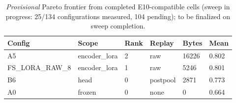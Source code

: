 \begin{table}[t]
\centering
\small
\caption{\emph{Provisional} Pareto frontier from completed E10-compatible cells
(sweep in progress: 25/134 configurations measured, 104 pending); to be
finalized on sweep completion.}
\label{tab:e10_frontier}
\begin{tabular}{llllll}
\toprule
Config & Scope & Rank & Replay & Bytes & Mean \\
\midrule
A5 & encoder\_lora & 2 & raw & 16226 & 0.802 \\
FS\_LORA\_RAW\_8 & encoder\_lora & 1 & raw & 5246 & 0.801 \\
B6 & head & 0 & postpool & 2871 & 0.773 \\
A0 & frozen & 0 & none & 0 & 0.664 \\
\bottomrule
\end{tabular}
\end{table}
